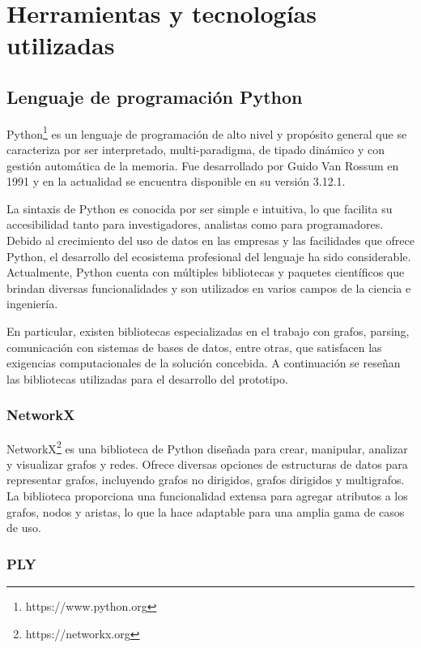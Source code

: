 \section{Herramientas y tecnologías utilizadas}\label{section:tools}

\subsection{Lenguaje de programación Python}

Python\footnote{https://www.python.org} es un lenguaje de programación de alto nivel y propósito general que se caracteriza por ser 
interpretado, multi-paradigma, de tipado dinámico y con gestión automática de la memoria. Fue desarrollado 
por Guido Van Rossum en 1991 y en la actualidad se encuentra disponible en su versión 3.12.1.

La sintaxis de Python es conocida por ser simple e intuitiva, lo que facilita su accesibilidad tanto para 
investigadores, analistas como para programadores. Debido al crecimiento del uso de datos en las empresas y 
las facilidades que ofrece Python, el desarrollo del ecosistema profesional del lenguaje ha sido considerable. 
Actualmente, Python cuenta con múltiples bibliotecas y paquetes científicos que brindan diversas funcionalidades 
y son utilizados en varios campos de la ciencia e ingeniería.

En particular, existen bibliotecas especializadas en el trabajo con grafos, parsing, comunicación 
con sistemas de bases de datos, entre otras, que satisfacen las exigencias computacionales de la 
solución concebida. A continuación se reseñan las bibliotecas utilizadas para el desarrollo del prototipo.

\subsubsection{NetworkX}

NetworkX\footnote{https://networkx.org} es una biblioteca de Python diseñada para crear, manipular, analizar y visualizar 
grafos y redes. Ofrece diversas 
opciones de estructuras de datos para representar grafos, incluyendo grafos no dirigidos, grafos dirigidos y 
multigrafos. La biblioteca proporciona una funcionalidad extensa para agregar atributos a los grafos, nodos y 
aristas, lo que la hace adaptable para una amplia gama de casos de uso.

\subsubsection{PLY}

